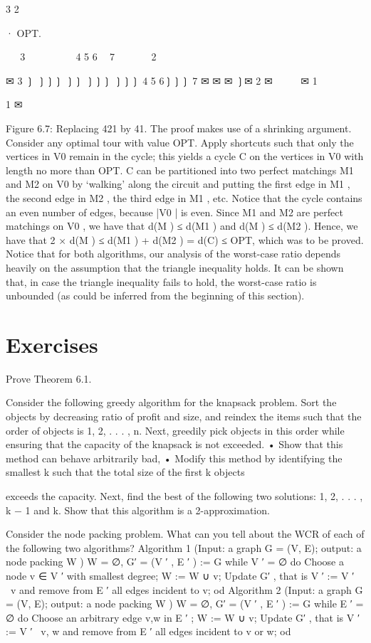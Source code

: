 3
2

· OPT.

❳❳❳
3 ✉
❳❳
❳❳❳
❳❳
❳❳❳
4
5
6 ❳❳ 7
✉
✉
✉
✉
❳✉
2

✉
3 ❳
❳❳❳
❳❳
❳❳❳
❳❳❳
4
5
6❳❳❳ 7
✉
✉
✉
❳✉
2 ✉
 
 
 
✉
1  

1 ✉

Figure 6.7: Replacing 421 by 41.
The proof makes use of a shrinking argument. Consider any optimal tour with value OPT. Apply
shortcuts such that only the vertices in V0 remain in the cycle; this yields a cycle C on the vertices in
V0 with length no more than OPT. C can be partitioned into two perfect matchings M1 and M2 on V0
by ‘walking' along the circuit and putting the first edge in M1 , the second edge in M2 , the third edge in
M1 , etc. Notice that the cycle contains an even number of edges, because |V0 | is even.
Since M1 and M2 are perfect matchings on V0 , we have that d(M ) ≤ d(M1 ) and d(M ) ≤ d(M2 ). Hence,
we have that 2 × d(M ) ≤ d(M1 ) + d(M2 ) = d(C) ≤ OPT, which was to be proved.
Notice that for both algorithms, our analysis of the worst-case ratio depends heavily on the assumption
that the triangle inequality holds. It can be shown that, in case the triangle inequality fails to hold, the
worst-case ratio is unbounded (as could be inferred from the beginning of this section).

\section*{Exercises}
\begin{exercise}
Prove Theorem 6.1.
\end{exercise}

\begin{exercise}
Consider the following greedy algorithm for the knapsack problem. Sort the objects by decreasing ratio
of profit and size, and reindex the items such that the order of objects is 1, 2, . . . , n. Next, greedily pick
objects in this order while ensuring that the capacity of the knapsack is not exceeded.
• Show that this method can behave arbitrarily bad,
• Modify this method by identifying the smallest k such that the total size of the first k objects

exceeds the capacity. Next, find the best of the following two solutions: {1, 2, . . . , k − 1} and {k}.
Show that this algorithm is a 2-approximation.
\end{exercise}

\begin{exercise}
Consider the node packing problem. What can you tell about the WCR of each of the following two
algorithms?
Algorithm 1 (Input: a graph G = (V, E); output: a node packing W )
W = ∅, G′ = (V ′ , E ′ ) := G
while V ′ = ∅
do
Choose a node v ∈ V ′ with smallest degree;
W := W ∪ {v};
Update G′ , that is V ′ := V ′ \ {v} and remove from E ′ all edges incident to v;
od
Algorithm 2 (Input: a graph G = (V, E); output: a node packing W )
W = ∅, G′ = (V ′ , E ′ ) := G
while E ′ = ∅
do
Choose an arbitrary edge {v,w} in E ′ ;
W := W ∪ {v};
Update G′ , that is V ′ := V ′ \ {v, w} and remove from E ′ all edges incident to v or w;
od
\end{exercise}

